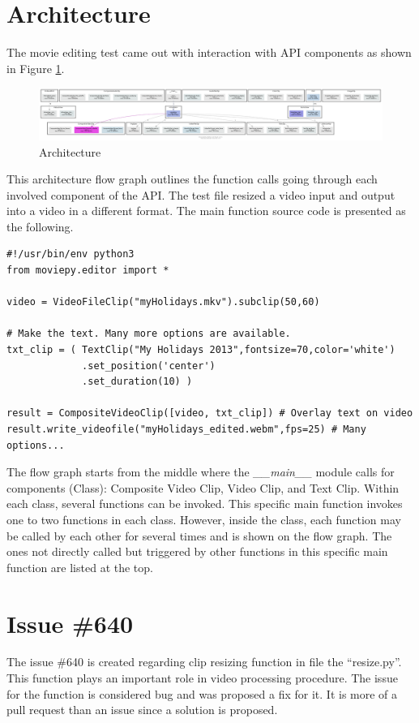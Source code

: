 \documentclass[a4paper, 11pt]{article}
\begin{document}
\section{Architecture}
The movie editing test came out with interaction with API components as shown in Figure \ref{figure:graph}.

\begin{figure}[ht]
  \centering
  \includegraphics[width=\linewidth]{pycallgraph.png}
  \caption{Architecture}
   \label{figure:graph}
  \end{figure}
\FloatBarrier

This architecture flow graph outlines the function calls going through each involved component of the API. The test file resized a video input and output into a video in a different format. The main function source code is presented as the following.

\begin{lstlisting}
#!/usr/bin/env python3
from moviepy.editor import *

video = VideoFileClip("myHolidays.mkv").subclip(50,60)

# Make the text. Many more options are available.
txt_clip = ( TextClip("My Holidays 2013",fontsize=70,color='white')
             .set_position('center')
             .set_duration(10) )

result = CompositeVideoClip([video, txt_clip]) # Overlay text on video
result.write_videofile("myHolidays_edited.webm",fps=25) # Many options...
\end{lstlisting}

The flow graph starts from the middle where the \textit{\_\_main\_\_} module calls for components (Class): Composite Video Clip, Video Clip, and Text Clip. Within each class, several functions can be invoked. This specific main function invokes one to two functions in each class. However, inside the class, each function may be called by each other for several times and is shown on the flow graph. The ones not directly called but triggered by other functions in this specific main function are listed at the top.


\section{Issue \#640}
The issue \#640 is created regarding clip resizing function in file the ``resize.py''. This function plays an important role in video processing procedure. The issue for the function is considered bug and was proposed a fix for it. It is more of a pull request than an issue since a solution is proposed. \\
\end{document}
